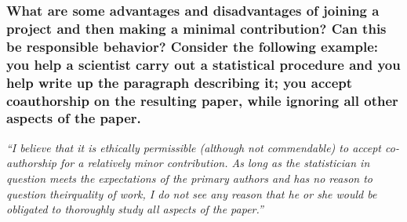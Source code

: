\documentclass[12pt]{beamer}
\newcommand\ans[1]{{\it ``#1''}}
\begin{document}
\begin{frame} %
\frametitle{ What are some advantages and disadvantages of joining a project and then making a minimal contribution? Can this be responsible behavior? Consider the following example: you help a scientist carry out a statistical procedure and you help write up the paragraph describing it; you accept coauthorship on the resulting paper, while ignoring all other aspects of the paper.
}

\ans{I  believe  that  it  is  ethically  permissible  (although  not  commendable)  to  accept  co-authorship for a relatively minor contribution.  As long as the statistician in question meets  the  expectations  of  the  primary  authors  and  has  no  reason  to  question  theirquality of work, I do not see any reason that he or she would be obligated to thoroughly study all aspects of the paper.}








\end{frame}
\end{document}
